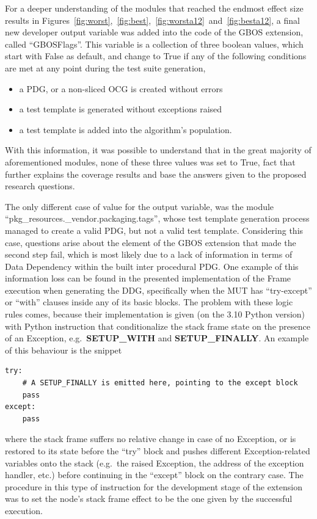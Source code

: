 \documentclass[%
  chapterprefix=false,%
  open=right,%
  twoside=true,%
  paper=a4,%
  logofile={Figures/logo.png},%
  thesistype=master,%
  UKenglish,%
]{se2thesis}
\begin{document}
For a deeper understanding of the modules that reached the endmost effect size results in Figures~\ref{fig:worst},~\ref{fig:best},~\ref{fig:worsta12}~and~\ref{fig:besta12}, a final new developer output variable was added into the code of the GBOS extension, called ``GBOSFlags''.
This variable is a collection of three boolean values, which start with False as default, and change to True if any of the following conditions are met at any point during the test suite generation,
\begin{itemize}
  \item a PDG, or a non-sliced OCG is created without errors
  \item a test template is generated without exceptions raised
  \item a test template is added into the algorithm's population.
\end{itemize}
With this information, it was possible to understand that in the great majority of aforementioned modules, none of these three values was set to True, fact that further explains the coverage results and base the answers given to the proposed research questions.

The only different case of value for the output variable, was the module ``pkg\_resources.\_vendor.packaging.tags'', whose test template generation process managed to create a valid PDG, but not a valid test template.
Considering this case, questions arise about the element of the GBOS extension that made the second step fail, which is most likely due to a lack of information in terms of Data Dependency within the built inter procedural PDG.\@
One example of this information loss can be found in the presented implementation of the Frame execution when generating the DDG, specifically when the MUT has ``try-except'' or ``with'' clauses inside any of its basic blocks.
The problem with these logic rules comes, because their implementation is given (on the 3.10 Python version) with Python instruction that conditionalize the stack frame state on the presence of an Exception, e.g.~\textbf{SETUP\_WITH} and \textbf{SETUP\_FINALLY}.
An example of this behaviour is the snippet

\begin{verbatim}
try:
    # A SETUP_FINALLY is emitted here, pointing to the except block
    pass
except:
    pass
\end{verbatim}

where the stack frame suffers no relative change in case of no Exception, or is restored to its state before the ``try'' block and pushes different Exception-related variables onto the stack (e.g.~the raised Exception, the address of the exception handler, etc.) before continuing in the ``except'' block on the contrary case.  
The procedure in this type of instruction for the development stage of the extension was to set the node's stack frame effect to be the one given by the successful execution.
\end{document}
